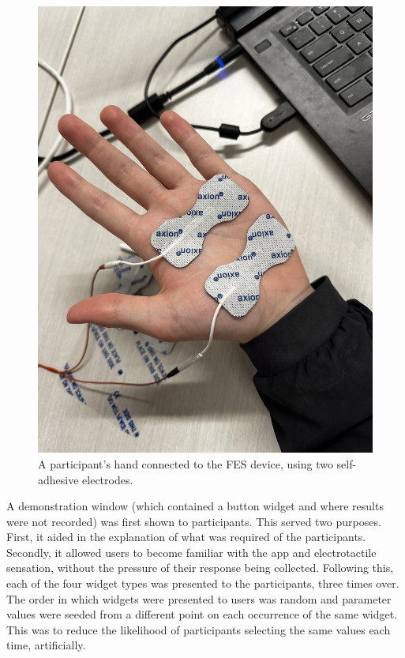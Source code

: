 \documentclass{mpaper}
\begin{document}
\begin{figure}
    \centering
    \includegraphics[scale=0.2, angle=270]{images/IMG_5135.JPG}
    \caption{A participant's hand connected to the FES device, using two self-adhesive electrodes.}
    \label{fig:hand}
\end{figure}

A demonstration window (which contained a button widget and where results were not recorded) was first shown to participants. This served two purposes. First, it aided in the explanation of what was required of the participants. Secondly, it allowed users to become familiar with the app and electrotactile sensation, without the pressure of their response being collected. Following this, each of the four widget types was presented to the participants, three times over. The order in which widgets were presented to users was random and parameter values were seeded from a different point on each occurrence of the same widget. This was to reduce the likelihood of participants selecting the same values each time, artificially. 
\end{document}
